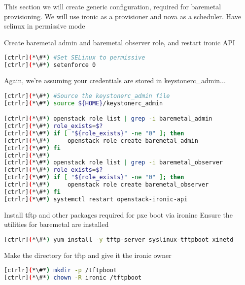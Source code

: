 This section we will create generic configuration, required for baremetal provisioning. We will use ironic as a provisioner and nova as a scheduler.
Have selinux in permissive mode

Create baremetal admin and baremetal observer role, and restart ironic API



\begin{lstlisting}[language=bash,keywords={}]
[ctrlr](*\#*) #Set SELinux to permissive
[ctrlr](*\#*) setenforce 0
\end{lstlisting}

Again, we're assuming your credentials are stored in keystonerc_admin...

\begin{lstlisting}[language=bash,keywords={}]
[ctrlr](*\#*) #Source the keystonerc_admin file
[ctrlr](*\#*) source ${HOME}/keystonerc_admin

[ctrlr](*\#*) openstack role list | grep -i baremetal_admin
[ctrlr](*\#*) role_exists=$?
[ctrlr](*\#*) if [ "${role_exists}" -ne "0" ]; then 
[ctrlr](*\#*)     openstack role create baremetal_admin
[ctrlr](*\#*) fi
[ctrlr](*\#*) 
[ctrlr](*\#*) openstack role list | grep -i baremetal_observer 
[ctrlr](*\#*) role_exists=$?
[ctrlr](*\#*) if [ "${role_exists}" -ne "0" ]; then
[ctrlr](*\#*)     openstack role create baremetal_observer
[ctrlr](*\#*) fi
[ctrlr](*\#*) systemctl restart openstack-ironic-api
\end{lstlisting} 

Install tftp and other packages required for pxe boot via ironinc
Ensure the utilities for baremetal are installed


\begin{lstlisting}[language=bash,keywords={}]
[ctrlr](*\#*) yum install -y tftp-server syslinux-tftpboot xinetd
\end{lstlisting} 

Make the directory for tftp and give it the ironic owner


\begin{lstlisting}[language=bash,keywords={}]
[ctrlr](*\#*) mkdir -p /tftpboot
[ctrlr](*\#*) chown -R ironic /tftpboot
\end{lstlisting} 

